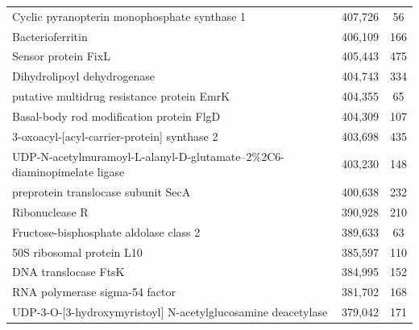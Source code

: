 \begin{singlespace}
\begin{longtable}{p{} cc}
                                              Cyclic pyranopterin monophosphate synthase 1 &                     407,726 &            56 \\
                                                                          Bacterioferritin &                     406,109 &           166 \\
                                                                       Sensor protein FixL &                     405,443 &           475 \\
                                                               Dihydrolipoyl dehydrogenase &                     404,743 &           334 \\
                                                putative multidrug resistance protein EmrK &                     404,355 &            65 \\
                                                  Basal-body rod modification protein FlgD &                     404,309 &           107 \\
                                               3-oxoacyl-[acyl-carrier-protein] synthase 2 &                     403,698 &           435 \\
                   UDP-N-acetylmuramoyl-L-alanyl-D-glutamate--2\%2C6-diaminopimelate ligase &                     403,230 &           148 \\
                                                       preprotein translocase subunit SecA &                     400,638 &           232 \\
                                                                            Ribonuclease R &                     390,928 &           210 \\
                                                    Fructose-bisphosphate aldolase class 2 &                     389,633 &            63 \\
                                                                 50S ribosomal protein L10 &                     385,597 &           110 \\
                                                                      DNA translocase FtsK &                     384,995 &           152 \\
                                                            RNA polymerase sigma-54 factor &                     381,702 &           168 \\
                              UDP-3-O-[3-hydroxymyristoyl] N-acetylglucosamine deacetylase &                     379,042 &           171 \\

\end{longtable}
\end{singlespace}
